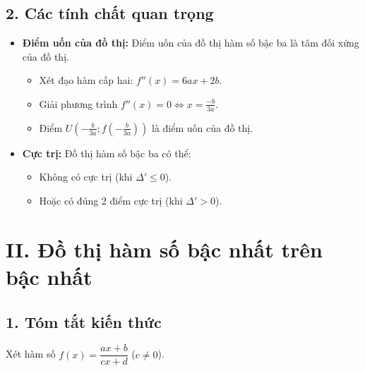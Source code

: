 \documentclass[12pt,a4paper]{extarticle}
\begin{document}
\subsection*{2. Các tính chất quan trọng}
\begin{itemize}[leftmargin=*]
    \item \textbf{Điểm uốn của đồ thị:} Điểm uốn của đồ thị hàm số bậc ba là tâm đối xứng của đồ thị.
    \begin{itemize}
        \item Xét đạo hàm cấp hai: $f''(x) = 6ax + 2b$.
        \item Giải phương trình $f''(x) = 0 \Leftrightarrow x = \frac{-b}{3a}$.
        \item Điểm $U\left(-\frac{b}{3a}; f\left(-\frac{b}{3a}\right)\right)$ là điểm uốn của đồ thị.
    \end{itemize}
    \item \textbf{Cực trị:} Đồ thị hàm số bậc ba có thể:
    \begin{itemize}
        \item Không có cực trị (khi $\Delta' \le 0$).
        \item Hoặc có đúng 2 điểm cực trị (khi $\Delta' > 0$).
    \end{itemize}
\end{itemize}
\section*{II. Đồ thị hàm số bậc nhất trên bậc nhất}

\subsection*{1. Tóm tắt kiến thức}

Xét hàm số $f(x) = \dfrac{ax + b}{cx + d}$ ($c \neq 0$).
\end{document}
